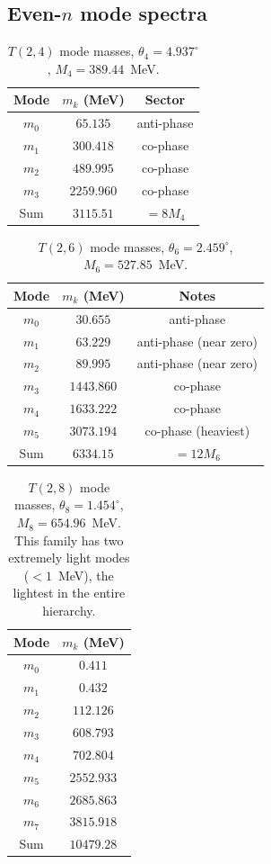 \documentclass[11pt]{article}
\begin{document}
\subsection{Even-$n$ mode spectra}

\begin{table}[ht]
  \caption{$T(2,4)$ mode masses, $\theta_4 = 4.937^\circ$, $M_4 = 389.44$~MeV.}
  \label{tab:Z4_masses}
  \begin{tabular}{ccc}
    \toprule
    Mode & $m_k$ (MeV) & Sector \\
    \midrule
    $m_0$ & $65.135$   & anti-phase \\
    $m_1$ & $300.418$  & co-phase \\
    $m_2$ & $489.995$  & co-phase \\
    $m_3$ & $2259.960$ & co-phase \\
    \midrule
    Sum & $3115.51$ & $= 8M_4$ \\
    \bottomrule
  \end{tabular}
\end{table}

\begin{table}[ht]
  \caption{$T(2,6)$ mode masses, $\theta_6 = 2.459^\circ$, $M_6 = 527.85$~MeV.}
  \label{tab:Z6_masses}
  \begin{tabular}{ccc}
    \toprule
    Mode & $m_k$ (MeV) & Notes \\
    \midrule
    $m_0$ & $30.655$   & anti-phase \\
    $m_1$ & $63.229$   & anti-phase (near zero) \\
    $m_2$ & $89.995$   & anti-phase (near zero) \\
    $m_3$ & $1443.860$ & co-phase \\
    $m_4$ & $1633.222$ & co-phase \\
    $m_5$ & $3073.194$ & co-phase (heaviest) \\
    \midrule
    Sum & $6334.15$ & $= 12M_6$ \\
    \bottomrule
  \end{tabular}
\end{table}

\begin{table}[ht]
  \caption{$T(2,8)$ mode masses, $\theta_8 = 1.454^\circ$, $M_8 = 654.96$~MeV.
    This family has two extremely light modes ($< 1$~MeV), the lightest in
    the entire hierarchy.}
  \label{tab:Z8_masses}
  \begin{tabular}{cc}
    \toprule
    Mode & $m_k$ (MeV) \\
    \midrule
    $m_0$ & $0.411$ \\
    $m_1$ & $0.432$ \\
    $m_2$ & $112.126$ \\
    $m_3$ & $608.793$ \\
    $m_4$ & $702.804$ \\
    $m_5$ & $2552.933$ \\
    $m_6$ & $2685.863$ \\
    $m_7$ & $3815.918$ \\
    \midrule
    Sum & $10479.28$ \\
    \bottomrule
  \end{tabular}
\end{table}
\end{document}
